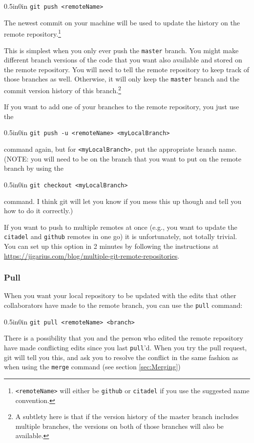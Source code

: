 \documentclass[11pt]{article}
\newcommand{\code}[1]{\begin{adjustwidth}{0.5in}{0in}
    \texttt{#1}
    \end{adjustwidth}}
\begin{document}
\code{git push <remoteName>}

The newest commit on your machine will be used to update the history on the remote repository.\footnote{\texttt{<remoteName>} will either be \texttt{github} or \texttt{citadel} if you use the suggested name convention.}

This is simplest when you only ever push the \texttt{master} branch.  You might make different branch versions of the code that you want also available and stored on the remote repository.  You will need to tell the remote repository to keep track of those branches as well.  Otherwise, it will only keep the \texttt{master} branch and the commit version history of this branch.\footnote{A subtlety here is that if the version history of the master branch includes multiple branches, the versions on both of those branches will also be available.}

If you want to add one of your branches to the remote repository, you just use the 

\code{git push -u <remoteName> <myLocalBranch>}  

command again, but for \texttt{<myLocalBranch>}, put the appropriate branch name.  (NOTE: you will need to be on the branch that you want to put on the remote branch by using the \code{git checkout <myLocalBranch>} command.  I think git will let you know if you mess this up though and tell you how to do it correctly.)

If you want to push to multiple remotes at once (e.g., you want to update the \texttt{citadel} and \texttt{github} remotes in one go) it is unfortunately, not totally trivial.  You can set up this option in 2 minutes by following the instructions at \url{https://jigarius.com/blog/multiple-git-remote-repositories}.

\subsubsection{Pull}

When you want your local repository to be updated with the edits that other collaborators have made to the remote branch, you can use the \texttt{pull} command:

\code{git pull <remoteName> <branch>}

There is a possibility that you and the person who edited the remote repository have made conflicting edits since you last \texttt{pull}'d.  When you try the pull request, git will tell you this, and ask you to resolve the conflict in the same fashion as when using the \texttt{merge} command (see section \ref{sec:Merging})
\end{document}
